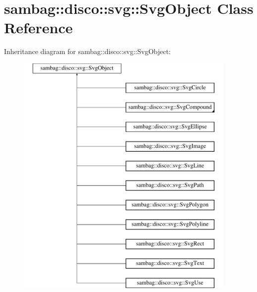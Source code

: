 \hypertarget{classsambag_1_1disco_1_1svg_1_1_svg_object}{
\section{sambag::disco::svg::SvgObject Class Reference}
\label{classsambag_1_1disco_1_1svg_1_1_svg_object}
}
Inheritance diagram for sambag::disco::svg::SvgObject:\begin{figure}[H]
\begin{center}
\leavevmode
\includegraphics[height=12.000000cm]{classsambag_1_1disco_1_1svg_1_1_svg_object}
\end{center}
\end{figure}
